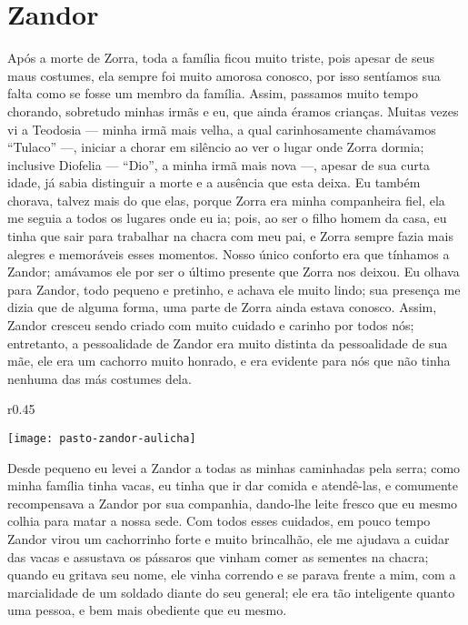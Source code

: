 \cleardoublepage
\newpage
{}
\chapter{Zandor}

Após a morte de Zorra, toda a família ficou muito triste, pois apesar de seus maus costumes, ela sempre foi muito amorosa conosco, por isso sentíamos sua falta como se fosse um membro da família. 
Assim, passamos muito tempo chorando, sobretudo minhas irmãs e eu, que ainda éramos crianças. 
Muitas vezes vi a Teodosia ---  minha irmã mais velha, a qual carinhosamente chamávamos ``Tulaco'' ---, iniciar a chorar em silêncio ao ver o lugar onde Zorra dormia; inclusive Diofelia  --- ``Dio'', a minha irmã mais nova ---, apesar de sua curta idade, já sabia distinguir a morte e a ausência que esta deixa. 
Eu também chorava, talvez mais do que elas, porque Zorra era minha companheira fiel, ela me seguia a todos os lugares onde eu ia; pois, ao ser o filho homem da casa, eu tinha que sair para trabalhar na chacra com meu pai, e Zorra sempre fazia mais alegres e memoráveis esses momentos.
Nosso único conforto era que tínhamos a Zandor; amávamos ele por ser o último presente que Zorra nos deixou.
Eu olhava para Zandor, todo pequeno e pretinho, e achava ele muito lindo; sua presença me dizia que de alguma forma, uma parte de Zorra ainda estava conosco. 
Assim, Zandor cresceu sendo criado com muito cuidado e carinho por todos nós;
entretanto, a pessoalidade de Zandor era muito distinta da pessoalidade de sua mãe, ele era um cachorro muito honrado, e era evidente para nós que não tinha nenhuma das más costumes dela. 
\begin{wrapfigure}{r}{0.45\textwidth}
  \begin{center}
  \vspace{-20pt}
    \texttt{[image: pasto-zandor-aulicha]}
  \end{center}
  \vspace{-20pt}
\end{wrapfigure}
Desde pequeno eu levei a Zandor a todas as minhas caminhadas pela serra; como minha família tinha vacas, eu tinha que ir dar comida e atendê-las, e comumente recompensava a Zandor por sua companhia, dando-lhe leite fresco que eu mesmo colhia para matar a nossa sede. 
Com todos esses cuidados, em pouco tempo Zandor virou um cachorrinho forte e muito brincalhão,
ele me ajudava a cuidar das vacas e assustava os pássaros que vinham comer as sementes na chacra; quando eu gritava seu nome, ele vinha correndo e se parava frente a mim, com a marcialidade de um soldado diante do seu general; ele era tão inteligente quanto uma pessoa, e bem mais obediente que eu mesmo.

